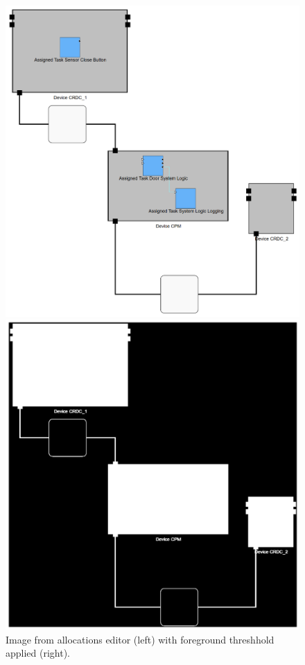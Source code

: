 \begin{figure}[htb]
    \centering
    \begin{minipage}[b]{0.36\textwidth}
        \includegraphics[width=\textwidth]{Pictures/foreground_threshhold_before.png}
    \end{minipage}
    \hfill
    \begin{minipage}[b]{0.36\textwidth}
        \includegraphics[width=\textwidth]{Pictures/foreground_threshhold_after.png}
    \end{minipage}
    \caption{Image from allocations editor (left) with foreground threshhold applied (right).}
    \label{fig_foreground_threshhold}
\end{figure}\\

